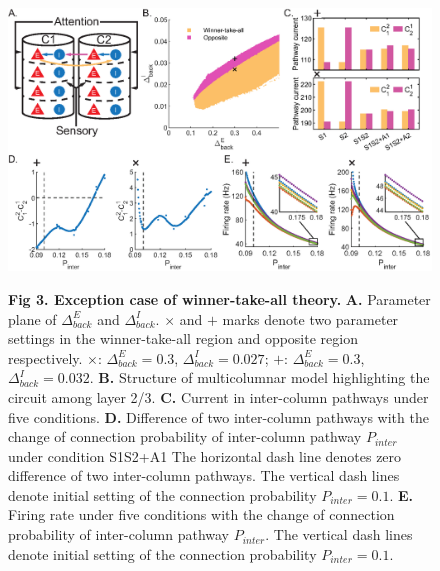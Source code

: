 \documentclass[10pt,letterpaper]{article}
\begin{document}
\begin{figure}[!h]
\begin{adjustwidth}{-2in}{0.3in} %
\centering
\includegraphics{Figure3.eps}
\begin{flushleft} {\bf Fig 3. Exception case of winner-take-all theory.}
\textbf{A.} Parameter plane of $\Delta_{back}^{E}$ and $\Delta_{back}^{I}$. $\times$ and $+$ marks denote two parameter settings in the winner-take-all region and opposite region respectively. $\times$: $\Delta_{back}^{E}=0.3$, $\Delta_{back}^{I}=0.027$; $+$: $\Delta_{back}^{E}=0.3$, $\Delta_{back}^{I}=0.032$. \textbf{B.} Structure of multicolumnar model highlighting the circuit among layer 2/3. \textbf{C.} Current in inter-column pathways under five conditions. \textbf{D.} Difference of two inter-column pathways with the change of connection probability of inter-column pathway $P_{inter}$ under condition S1S2+A1 The horizontal dash line denotes zero difference of two inter-column pathways. The vertical dash lines denote initial setting of the connection probability $P_{inter}=0.1$. \textbf{E.} Firing rate under five conditions with the change of connection probability of inter-column pathway $P_{inter}$. The vertical dash lines denote initial setting of the connection probability $P_{inter}=0.1$.
\end{flushleft}
\hypertarget{fig:fig3}{}
\end{adjustwidth}
\end{figure}
\end{document}
